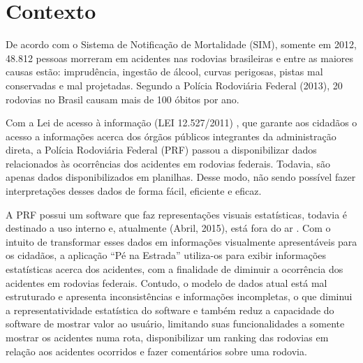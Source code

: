 \section[Contexto]{Contexto}

De acordo com o Sistema de Notificação de Mortalidade (SIM), somente em 2012,
48.812 pessoas morreram em acidentes nas rodovias brasileiras e entre as maiores causas
estão: imprudência, ingestão de álcool, curvas perigosas, pistas mal conservadas e mal
projetadas. Segundo a Polícia Rodoviária Federal (2013), 20 rodovias no Brasil causam
mais de 100 óbitos por ano.

Com a Lei de acesso à informação (LEI 12.527/2011) \cite{brasil11}, que garante
aos cidadãos o acesso a informações acerca dos órgãos públicos integrantes da
administração direta, a Polícia Rodoviária Federal (PRF) passou a disponibilizar dados
relacionados às ocorrências dos acidentes em rodovias federais. Todavia, são apenas
dados disponibilizados em planilhas. Desse modo, não sendo possível fazer interpretações
desses dados de forma fácil, eficiente e eficaz.

A PRF possui um software que faz representações visuais estatísticas, todavia é
destinado a uso interno e, atualmente (Abril, 2015), está fora do ar . Com o intuito de
transformar esses dados em informações visualmente apresentáveis para os cidadãos, a
aplicação “Pé na Estrada” utiliza-os para exibir informações estatísticas acerca dos
acidentes, com a finalidade de diminuir a ocorrência dos acidentes em rodovias federais.
Contudo, o modelo de dados atual está mal estruturado e apresenta inconsistências e
informações incompletas, o que diminui a representatividade estatística do software e
também reduz a capacidade do software de mostrar valor ao usuário, limitando suas
funcionalidades a somente mostrar os acidentes numa rota, disponibilizar um ranking das
rodovias em relação aos acidentes ocorridos e fazer comentários sobre uma rodovia.